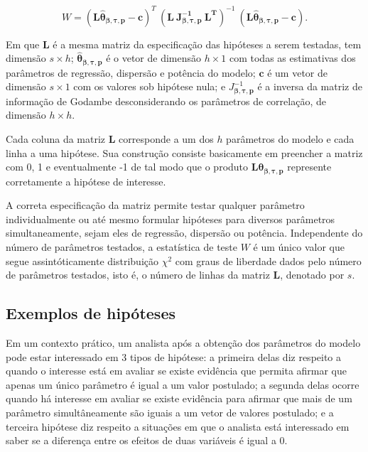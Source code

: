 \begin{equation}
W = (\boldsymbol{L\hat\theta_{\beta,\tau,p}} - \boldsymbol{c})^T \ (\boldsymbol{L \ J_{\boldsymbol{{\beta,\tau,p}}}^{-1} \ L^T})^{-1} \ (\boldsymbol{L\hat\theta_{\beta,\tau,p}} - \boldsymbol{c}).
\end{equation}

\noindent Em que $\boldsymbol{L}$ é a mesma matriz da especificação das hipóteses a serem testadas, tem dimensão $s \times h$; $\boldsymbol{\hat\theta_{\beta,\tau,p}}$ é o vetor de dimensão $h \times 1$ com todas as estimativas dos parâmetros de regressão, dispersão e potência do modelo; $\boldsymbol{c}$ é um vetor de dimensão $s \times 1$ com os valores sob hipótese nula; e $J_{\boldsymbol{{\beta,\tau,p}}}^{-1}$ é a inversa da matriz de informação de Godambe desconsiderando os parâmetros de correlação, de dimensão $h \times h$.

Cada coluna da matriz $\boldsymbol{L}$ corresponde a um dos $h$ parâmetros do modelo e cada linha a uma hipótese. Sua construção consiste basicamente em preencher a matriz com 0, 1 e eventualmente -1 de tal modo que o produto $\boldsymbol{L}\boldsymbol{\theta_{\beta,\tau,p}}$ represente corretamente a hipótese de interesse.

A correta especificação da matriz permite testar qualquer parâmetro individualmente ou até mesmo formular hipóteses para diversos parâmetros simultaneamente, sejam eles de regressão, dispersão ou potência. Independente do número de parâmetros testados, a estatística de teste $W$ é um único valor que segue assintóticamente distribuição $\chi^2$ com graus de liberdade dados pelo número de parâmetros testados, isto é, o número de linhas da matriz $\boldsymbol{L}$, denotado por $s$.

\subsection{Exemplos de hipóteses}

Em um contexto prático, um analista após a obtenção dos parâmetros do modelo pode estar interessado em 3 tipos de hipótese: a primeira delas diz respeito a quando o interesse está em avaliar se existe evidência que permita afirmar que apenas um único parâmetro é igual a um valor postulado; a segunda delas ocorre quando há interesse em avaliar se existe evidência para afirmar que mais de um parâmetro simultâneamente são iguais a um vetor de valores postulado; e a terceira hipótese diz respeito a situações em que o analista está interessado em saber se a diferença entre os efeitos de duas variáveis é igual a 0.

